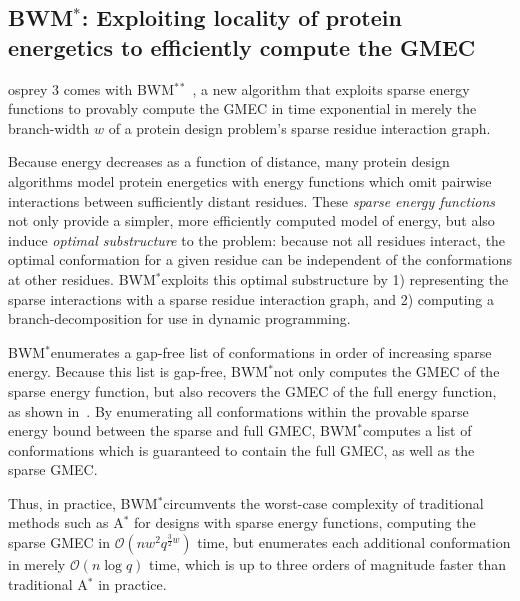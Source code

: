 \def\bwmstar{BWM$^*$}
\def\Oh{$\mathcal{O}$}
\subsection{\bwmstar: Exploiting locality of protein energetics to efficiently compute the GMEC}


{\sc osprey} 3 comes with \bwmstar$^*$~\cite{BWM_JCB}, a new algorithm that exploits sparse energy functions to provably compute the GMEC in time exponential in merely the branch-width $w$ of a protein design problem's sparse residue interaction graph.

Because energy decreases as a function of distance, many protein design algorithms model protein energetics with energy functions which omit pairwise interactions between sufficiently distant residues. These \emph{sparse energy functions} not only provide a simpler, more efficiently computed model of energy, but also induce \emph{optimal substructure} to the problem: because not all residues interact, the optimal conformation for a given residue can be independent of the conformations at other residues. \bwmstar exploits this optimal substructure by 1) representing the sparse interactions with a sparse residue interaction graph, and 2) computing a branch-decomposition for use in dynamic programming. 

\bwmstar enumerates a gap-free list of conformations in order of increasing sparse energy. Because this list is gap-free, \bwmstar not only computes the GMEC of the sparse energy function, but also recovers the GMEC of the full energy function, as shown in~\cite{BWM_JCB}. By enumerating all conformations within the provable sparse energy bound between the sparse and full GMEC, \bwmstar computes a list of conformations which is guaranteed to contain the full GMEC, as well as the sparse GMEC.

Thus, in practice, \bwmstar circumvents the worst-case complexity of traditional methods such as A$^*$ for designs with sparse energy functions, computing the sparse GMEC in \Oh$(nw^2q^{\frac{3}{2}w})$ time, but enumerates each additional conformation in merely \Oh$(n\log q)$ time, which is up to three orders of magnitude faster than traditional A$^*$ in practice.